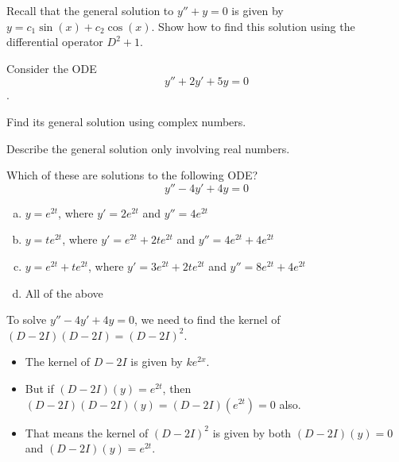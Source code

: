 \begin{applicationActivities}
\begin{activity}{15}
Recall that the general solution to \(y''+y=0\)
is given by \(y=c_1\sin(x)+c_2\cos(x)\).
Show how to find this solution using the differential
operator \(D^2+1\).
\end{activity}

\begin{activity}{15}
Consider the ODE \[y''+2y'+5y=0\].
\begin{subactivity}
Find its general solution using complex numbers.
\end{subactivity}
\begin{subactivity}
Describe the general solution only involving real numbers.
\end{subactivity}
\end{activity}


\begin{activity}{5}
Which of these are solutions to the following ODE? 
\[ y''-4y'+4y=0\]
\begin{enumerate}[a)]
\item \(y=e^{2t}\), where \(y'=2e^{2t}\) and \(y''=4e^{2t}\)
\item \(y=te^{2t}\), where \(y'=e^{2t}+2te^{2t}\) and \(y''=4e^{2t}+4e^{2t}\)
\item \(y=e^{2t}+te^{2t}\), where \(y'=3e^{2t}+2te^{2t}\) and \(y''=8e^{2t}+4e^{2t}\)
\item All of the above
\end{enumerate}
\end{activity}

\begin{observation}
To solve \(y''-4y'+4y=0\), we need to find the kernel of \( (D-2I)(D-2I)=(D-2I)^2 \).
\begin{itemize}
\item The kernel of \(D-2I\) is given by \(ke^{2x}\).
\item But if \( (D-2I)(y) = e^{2t} \), then \((D-2I)(D-2I)(y)=(D-2I)(e^{2t})=0\) also.
\item That means the kernel of \((D-2I)^2\) is given by both
  \((D-2I)(y)=0\) and \((D-2I)(y)=e^{2t}\).
\end{itemize}
\end{observation}


\end{applicationActivities}
